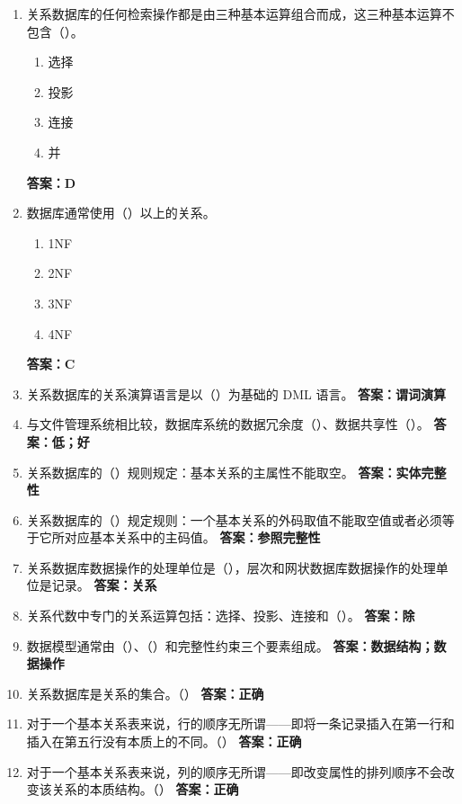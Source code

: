 \documentclass[12pt, a4paper]{article}
\begin{document}
\begin{enumerate}[label=\arabic*.]
	\item 关系数据库的任何检索操作都是由三种基本运算组合而成，这三种基本运算不包含（\quad）。
	      \begin{enumerate}
		      \item 选择
		      \item 投影
		      \item 连接
		      \item 并
	      \end{enumerate}
	      \textbf{答案：D}

	\item 数据库通常使用（\quad）以上的关系。
	      \begin{enumerate}
		      \item 1NF
		      \item 2NF
		      \item 3NF
		      \item 4NF
	      \end{enumerate}
	      \textbf{答案：C}

	\item 关系数据库的关系演算语言是以（\quad）为基础的 DML 语言。
	      \textbf{答案：谓词演算}

	\item 与文件管理系统相比较，数据库系统的数据冗余度（\quad）、数据共享性（\quad）。
	      \textbf{答案：低；好}

	\item 关系数据库的（\quad）规则规定：基本关系的主属性不能取空。
	      \textbf{答案：实体完整性}

	\item 关系数据库的（\quad）规定规则：一个基本关系的外码取值不能取空值或者必须等于它所对应基本关系中的主码值。
	      \textbf{答案：参照完整性}

	\item 关系数据库数据操作的处理单位是（\quad），层次和网状数据库数据操作的处理单位是记录。
	      \textbf{答案：关系}

	\item 关系代数中专门的关系运算包括：选择、投影、连接和（\quad）。
	      \textbf{答案：除}

	\item 数据模型通常由（\quad）、（\quad）和完整性约束三个要素组成。
	      \textbf{答案：数据结构；数据操作}

	\item 关系数据库是关系的集合。（\quad）
	      \textbf{答案：正确}

	\item 对于一个基本关系表来说，行的顺序无所谓——即将一条记录插入在第一行和插入在第五行没有本质上的不同。（\quad）
	      \textbf{答案：正确}

	\item 对于一个基本关系表来说，列的顺序无所谓——即改变属性的排列顺序不会改变该关系的本质结构。（\quad）
	      \textbf{答案：正确}
\end{enumerate}
\end{document}
